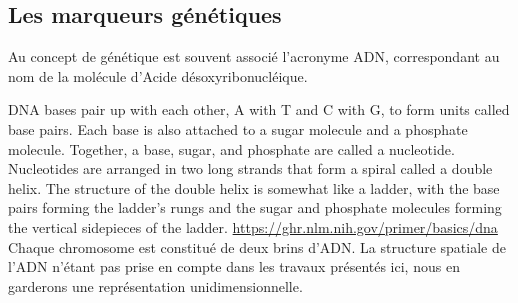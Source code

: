 \documentclass[12pt,twoside]{ugathesis}
\begin{document}
  \subsection{Les marqueurs génétiques}\label{les-marqueurs-genetiques}
  
  Au concept de génétique est souvent associé l'acronyme ADN,
  correspondant au nom de la molécule d'Acide désoxyribonucléique.
  
  DNA bases pair up with each other, A with T and C with G, to form units
  called base pairs. Each base is also attached to a sugar molecule and a
  phosphate molecule. Together, a base, sugar, and phosphate are called a
  nucleotide. Nucleotides are arranged in two long strands that form a
  spiral called a double helix. The structure of the double helix is
  somewhat like a ladder, with the base pairs forming the ladder's rungs
  and the sugar and phosphate molecules forming the vertical sidepieces of
  the ladder. \url{https://ghr.nlm.nih.gov/primer/basics/dna} Chaque
  chromosome est constitué de deux brins d'ADN. La structure spatiale de
  l'ADN n'étant pas prise en compte dans les travaux présentés ici, nous
  en garderons une représentation unidimensionnelle.
  
\end{document}

